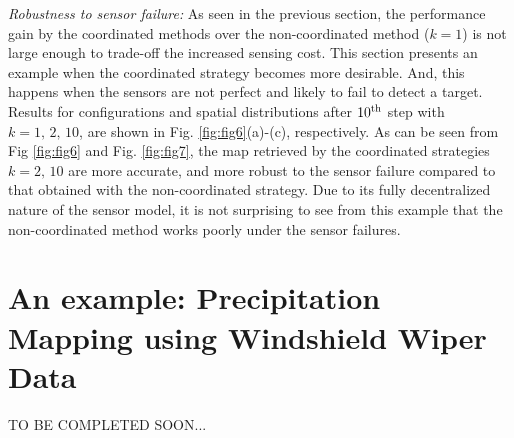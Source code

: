 \documentclass[journal]{IEEEtran}
\begin{document}
\textit{Robustness to sensor failure:}
As seen in the previous section, the performance gain by the coordinated methods over the non-coordinated method ($k=1$) is not large enough to trade-off the increased sensing cost.
This section presents an example when the coordinated strategy becomes more desirable. And, this happens when the sensors are not perfect and likely to fail to detect a target. 
Results for configurations and spatial distributions after $10^{\textup{th}}$ step with $k=1,\,2,\,10$, are shown in Fig. \ref{fig:fig6}(a)-(c), respectively.  
As can be seen from Fig \ref{fig:fig6} and Fig. \ref{fig:fig7}, the map retrieved by the coordinated strategies $k=2,\,10$ are more accurate, and more robust to the sensor failure compared to that obtained with the non-coordinated strategy. 
Due to its fully decentralized nature of the sensor model, it is not surprising to see from this example that the non-coordinated method works poorly under the sensor failures. 

\section{An example: Precipitation Mapping using Windshield Wiper Data}
\label{sec:sec8}
TO BE COMPLETED SOON...

\end{document}
